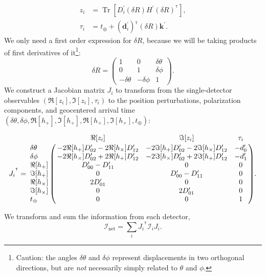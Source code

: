 \documentclass[amsmath,amssymb,aps,prx,reprint,nopreprintnumbers,nofootinbib,showpacs]{revtex4-1}
\DeclareMathOperator{\Tr}{Tr}
\newcommand\transpose{\ensuremath{^{^\mathsf{T}}}}
\begin{document}
%
\begin{align}
    z_i &= \Tr \left[ D_i^\prime (\delta R) H^\prime (\delta R)\transpose \right], \\
    \tau_i &= t_\oplus + (\mathbf{d}_i^\prime)\transpose (\delta R) \mathbf{k}^\prime.
\end{align}
%
We only need a first order expression for $\delta R$, because we will be taking products of first derivatives of it\footnote{Caution: the angles $\delta\theta$ and $\delta\phi$ represent displacements in two orthogonal directions, but are \emph{not} necessarily simply related to $\theta$ and $\phi$.}:
%
\begin{equation}
    \delta R = \left(
        \begin{array}{ccc}
            1 & 0 & \delta\theta \\
            0 & 1 & \delta\phi \\
            -\delta\theta & -\delta\phi & 1
        \end{array}
    \right).
\end{equation}
%
We construct a Jacobian matrix $J_i$ to transform from the single\nobreakdashes-detector observables $(\Re[z_i], \Im[z_i], \tau_i)$ to the position perturbations, polarization components, and geocentered arrival time \\ $(\delta\theta, \delta\phi, \Re[h_+], \Im[h_+], \Re[h_\times], \Im[h_\times], t_\oplus)$:
%
\begin{widetext}
\begin{equation}\label{eq:jacobian-detector-tensor}
    {J_i}\transpose = \bordermatrix{
        ~ & \Re[z_i] & \Im[z_i] & \tau_i \cr
        \delta\theta &
        -2\Re[h_+]D_{02}^\prime -2\Re[h_\times]D_{12}^\prime &
        -2\Im[h_+]D_{02}^\prime -2\Im[h_\times]D_{12}^\prime &
        -d_0^\prime \cr
        \delta\phi &
        -2\Re[h_\times]D_{02}^\prime +2\Re[h_+]D_{12}^\prime &
        -2\Im[h_\times]D_{02}^\prime +2\Im[h_+]D_{12}^\prime &
        -d_1^\prime \cr
        \Re[h_+] & D_{00}^\prime - D_{11}^\prime & 0 & 0 \cr
        \Im[h_+] & 0 & D_{00}^\prime - D_{11}^\prime & 0 \cr
        \Re[h_\times] & 2D_{01}^\prime & 0 & 0 \cr
        \Im[h_\times] & 0 & 2D_{01}^\prime & 0 \cr
        t_\oplus & 0 & 0 & 1
    }.
\end{equation}
\end{widetext}
%
We transform and sum the information from each detector,
%
\begin{equation}\label{eq:summed-information}
    \mathcal{I}_\mathrm{net} = \sum_i {J_i}\transpose \mathcal{I}_i {J_i}.
\end{equation}
\end{document}

